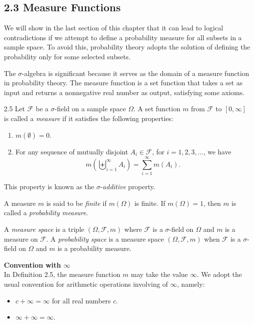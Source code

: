 \subsection*{2.3 Measure Functions}

We will show in the last section of this chapter that it can lead to logical contradictions if we attempt to define a probability measure for all subsets in a sample space. To avoid this, probability theory adopts the solution of defining the probability only for some selected subsets.

The $\sigma$-algebra is significant because it serves as the domain of a measure function in probability theory. The measure function is a set function that takes a set as input and returns a nonnegative real number as output, satisfying some axioms.

\begin{defbox}{2.5}
Let $\mathcal{F}$ be a $\sigma$-field on a sample space $\Omega$. A set function $m$ from $\mathcal{F}$ to $[0,\infty]$ is called a \textit{measure} if it satisfies the following properties:
\begin{enumerate}[label=\arabic*.]
    \item $m(\emptyset)=0$.
    \item For any sequence of mutually disjoint $A_i\in \mathcal{F}$, for $i=1,2,3,\dots$, we have
    \[
    m\left(\biguplus_{i=1}^{\infty} A_i\right)
    =
    \sum_{i=1}^{\infty} m(A_i).
    \]
\end{enumerate}

This property is known as the $\sigma$-\textit{additive} property.

A measure $m$ is said to be \textit{finite} if $m(\Omega)$ is finite. If $m(\Omega)=1$, then $m$ is called a \textit{probability measure}.

A \textit{measure space} is a triple $(\Omega,\mathcal{F},m)$ where $\mathcal{F}$ is a $\sigma$-field on $\Omega$ and $m$ is a measure on $\mathcal{F}$. A \textit{probability space} is a measure space $(\Omega,\mathcal{F},m)$ when $\mathcal{F}$ is a $\sigma$-field on $\Omega$ and $m$ is a probability measure.
\end{defbox}

\textbf{Convention with $\infty$} \\
In Definition 2.5, the measure function $m$ may take the value $\infty$. We adopt the usual convention for arithmetic operations involving of $\infty$, namely:
\begin{itemize}
    \item $c+\infty=\infty$ for all real numbers $c$.
    \item $\infty+\infty=\infty$.
\end{itemize}

